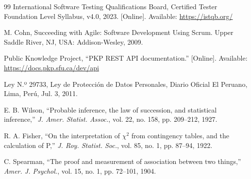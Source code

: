 \begin{thebibliography}{99}
   International Software Testing Qualifications Board, Certified Tester Foundation Level Syllabus, v4.0, 2023. [Online]. Available: \url{https://istqb.org/}

   M. Cohn, Succeeding with Agile: Software Development Using Scrum. Upper Saddle River, NJ, USA: Addison-Wesley, 2009.

   Public Knowledge Project, “PKP REST API documentation.” [Online]. Available: \url{https://docs.pkp.sfu.ca/dev/api}

   Ley N.º 29733, Ley de Protección de Datos Personales, Diario Oficial El Peruano, Lima, Perú, Jul. 3, 2011.

   E. B. Wilson, ``Probable inference, the law of succession, and statistical inference,'' \emph{J. Amer. Statist. Assoc.}, vol. 22, no. 158, pp. 209--212, 1927.

   R. A. Fisher, ``On the interpretation of $\chi^2$ from contingency tables, and the calculation of P,'' \emph{J. Roy. Statist. Soc.}, vol. 85, no. 1, pp. 87--94, 1922.

   C. Spearman, ``The proof and measurement of association between two things,'' \emph{Amer. J. Psychol.}, vol. 15, no. 1, pp. 72--101, 1904.

\end{thebibliography}

